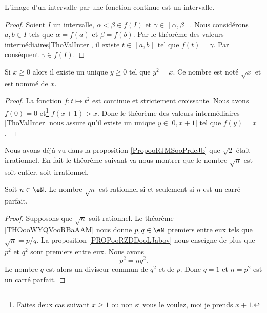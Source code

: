 \begin{corollary}       \label{CorImInterInter}
L'image d'un intervalle par une fonction continue est un intervalle.
\end{corollary}

\begin{proof}
Soient \( I\) un intervalle, \( \alpha<\beta\in f(I)\) et \( \gamma\in\mathopen] \alpha , \beta \mathclose[\). Nous considérons \(a,b\in I\) tels que \( \alpha=f(a)\) et \( \beta=f(b)\). Par le théorème des valeurs intermédiaires\ref{ThoValInter}, il existe \( t\in\mathopen] a , b \mathclose[\) tel que \( f(t)=\gamma\). Par conséquent \( \gamma\in f(I)\).
\end{proof}

\begin{corollaryDef}
    Si \( x\geq 0\) alors il existe un unique \( y\geq 0\) tel que \( y^2=x\). Ce nombre est noté \( \sqrt{x}\) et est nommé  de \( x\).
\end{corollaryDef}

\begin{proof}
    La fonction \( f\colon t\mapsto t^2\) est continue et strictement croissante. Nous avons \( f(0)=0\) et\footnote{Faites deux cas suivant \( x\geq 1\) ou non si vous le voulez, moi je prends \( x+1\).} \( f(x+1)>x\). Donc le théorème des valeurs intermédiaires \ref{ThoValInter} nous assure qu'il existe un unique \( y\in\mathopen[ 0 , x+1 \mathclose]\) tel que \( f(y)=x\).
\end{proof}

Nous avons déjà vu dans la proposition \ref{PropooRJMSooPrdeJb} que \( \sqrt{2}\) était irrationnel. En fait le théorème suivant va nous montrer que le nombre \( \sqrt{ n }\) est soit entier, soit irrationnel.
\begin{theorem}     \label{THOooYXJIooWcbnbm}
    Soit \( n\in \eN\). Le nombre \( \sqrt{n}\) est rationnel si et seulement si \( n\) est un carré parfait.
\end{theorem}

\begin{proof}
    Supposons que \( \sqrt{n}\) soit rationnel. Le théorème \ref{THOooWYQVooRBaAAM} nous donne \( p,q\in \eN\) premiers entre eux tels que \( \sqrt{n}=p/q\). La proposition \ref{PROPooRZDDooLJabov} nous enseigne de plus que \( p^2\) et \( q^2\) sont premiers entre eux. Nous avons
    \begin{equation}
        p^2=nq^2.
    \end{equation}
    Le nombre $q$ est alors un diviseur commun de \( q^2\) et de \( p\). Donc \( q=1\) et \( n=p^2\) est un carré parfait.
\end{proof}

